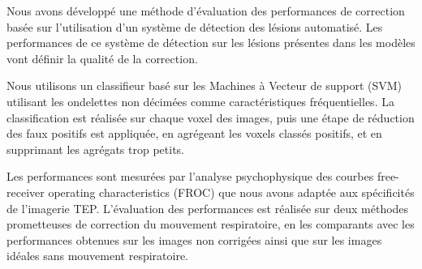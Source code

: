 Nous avons développé une méthode d'évaluation des performances de correction basée sur l'utilisation d'un système de détection des lésions automatisé. Les performances de ce système de détection sur les lésions présentes dans les modèles vont définir la qualité de la correction. 

Nous utilisons un classifieur basé sur les Machines à Vecteur de support (SVM) utilisant les ondelettes non décimées comme caractéristiques fréquentielles. La classification est réalisée sur chaque voxel des images, puis une étape de réduction des faux positifs est appliquée, en agrégeant les voxels classés positifs, et en supprimant les agrégats trop petits.

Les performances sont mesurées par l’analyse psychophysique des courbes free-receiver operating characteristics (FROC) que nous avons adaptée aux spécificités de l’imagerie TEP. L’évaluation des performances est réalisée sur deux méthodes prometteuses de correction du mouvement respiratoire, en les comparants avec les performances obtenues sur les images non corrigées ainsi que sur les images idéales sans mouvement respiratoire.
